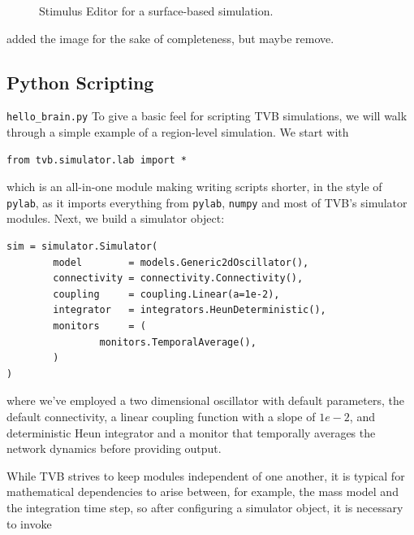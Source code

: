 	\begin{figure}[!htbp]
		\centering
		\caption{Stimulus Editor for a surface-based simulation.}
				\label{fig:stimulus}
	\end{figure}

	\note[psl] added the image for the sake of completeness, but maybe remove.  


\subsection{Python Scripting}

\texttt{hello\_brain.py}
To give a basic feel for scripting TVB simulations, we will 
walk through a simple example of a region-level simulation. We 
start with

\begin{lstlisting}
from tvb.simulator.lab import *
\end{lstlisting}

\noindent which is an all-in-one module making writing scripts
shorter, in the style of \texttt{pylab}, as it imports everything
from \texttt{pylab}, \texttt{numpy} and most of TVB's simulator
modules. Next, we build a simulator object:

\begin{lstlisting}
sim = simulator.Simulator(
		model        = models.Generic2dOscillator(), 
		connectivity = connectivity.Connectivity(),
		coupling     = coupling.Linear(a=1e-2),
		integrator   = integrators.HeunDeterministic(),
		monitors     = (
				monitors.TemporalAverage(), 
		)
)
\end{lstlisting}

\noindent where we've employed a two dimensional oscillator
with default parameters, the default connectivity, a linear 
coupling function with a slope of $1e-2$, and deterministic
Heun integrator and a monitor that temporally averages the 
network dynamics before providing output.

While TVB strives to keep modules independent of one another,
it is typical for mathematical dependencies to arise between, 
for example, the mass model and the integration time step, so
after configuring a simulator object, it is necessary to invoke

